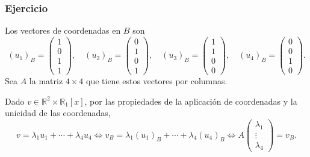 \begin{frame}[allowframebreaks]
    \frametitle{Ejercicio}

    \begin{solution}
        Los vectores de coordenadas en $B$ son
        \[
            (u_1)_B=\begin{pmatrix}1\\0\\1\\1\end{pmatrix},\quad
            (u_2)_B=\begin{pmatrix}0\\1\\0\\1\end{pmatrix},\quad
            (u_3)_B=\begin{pmatrix}1\\1\\0\\0\end{pmatrix},\quad
            (u_4)_B=\begin{pmatrix}0\\0\\1\\0\end{pmatrix}.
        \]
        Sea $A$ la matriz $4\times4$ que tiene estos vectores por columnas.

        Dado $v\in\mathbb{R}^2\times\mathbb{R}_1[x]$, por las propiedades
        de la aplicación de coordenadas y la unicidad de las coordenadas,
        \[
            v=\lambda_1u_1+\cdots+\lambda_4u_4
            \iff
            v_B=\lambda_1(u_1)_B+\cdots+\lambda_4(u_4)_B
            \iff
            A\begin{pmatrix}\lambda_1\\\vdots\\\lambda_4\end{pmatrix}=v_B.
        \]

        \framebreak


\end{solution}
\end{frame}
